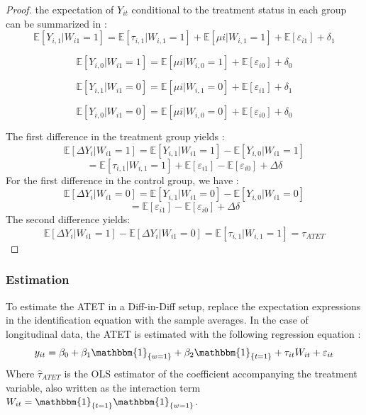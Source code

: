 \documentclass[12pt]{article}
\theoremstyle{plain}
\theoremstyle{remark}
\begin{document}
\begin{proof} the expectation of $Y_{it}$ conditional to the treatment status in each group can be summarized in :
\[\mathbb{E}\left[Y_{i,1}|W_{i1}=1 \right] = \mathbb{E}\left[\tau_{i,1}|W_{i,1}=1 \right] + \mathbb{E}\left[\mu{i}|W_{i,1}=1 \right]+\mathbb{E}\left[\varepsilon_{i1} \right] + \delta_1\]

\[\mathbb{E}\left[Y_{i,0}|W_{i1}=1 \right] = \mathbb{E}\left[\mu{i}|W_{i,0}=1 \right]+\mathbb{E}\left[\varepsilon_{i0} \right] + \delta_0\]

\[\mathbb{E}\left[Y_{i,1}|W_{i1}=0 \right] = \mathbb{E}\left[\mu{i}|W_{i,1}=0 \right]+\mathbb{E}\left[\varepsilon_{i1} \right] + \delta_1\]

\[\mathbb{E}\left[Y_{i,0}|W_{i1}=0 \right] = \mathbb{E}\left[\mu{i}|W_{i,0}=0 \right]+\mathbb{E}\left[\varepsilon_{i0} \right] + \delta_0\]
  
The first difference in the treatment group yields : 
\[\mathbb{E}\left[\Delta Y_{i}|W_{i1}=1 \right] = \mathbb{E}\left[Y_{i,1}|W_{i1}=1 \right]-\mathbb{E}\left[Y_{i,0}|W_{i1}=1 \right] \]
\[ = \mathbb{E}\left[\tau_{i,1}|W_{i,1}=1 \right] + \mathbb{E}\left[\varepsilon_{i1} \right] - \mathbb{E}\left[\varepsilon_{i0} \right]   + \Delta\delta \] 
For the first difference in the control group, we have :
\\
\[\mathbb{E}\left[\Delta Y_{i}|W_{i1}=0 \right] = \mathbb{E}\left[Y_{i,1}|W_{i1}=0 \right]-\mathbb{E}\left[Y_{i,0}|W_{i1}=0 \right] \]
\[ =  \mathbb{E}\left[\varepsilon_{i1} \right] - \mathbb{E}\left[\varepsilon_{i0} \right]   + \Delta\delta\] 
The second difference yields: \\
\[\mathbb{E}\left[\Delta Y_{i}|W_{i1}=1 \right]-\mathbb{E}\left[\Delta Y_{i}|W_{i1}=0 \right] = \mathbb{E}\left[\tau_{i,1}|W_{i,1}=1 \right]= \tau_{ATET}\]
\end{proof}

\subsubsection{Estimation}
To estimate the ATET in a Diff-in-Diff setup, replace the expectation expressions in the identification equation with the sample averages. In the case of longitudinal data, the ATET is estimated with the following regression equation :
    \begin{equation}
        y_{it}= \beta_0 + \beta_1 \mathbbm{1}_{\{w=1\}} + \beta_2\mathbbm{1}_{\{t=1\}}+ \tau_{it}W_{it} + \varepsilon_{it} 
    \end{equation}
Where $\hat{\tau}_{ATET}$ is the OLS estimator of the coefficient accompanying the treatment variable, also written as the interaction term  $W_{it}= \mathbbm{1}_{\{t=1\}}\mathbbm{1}_{\{w=1\}}$.
\end{document}
